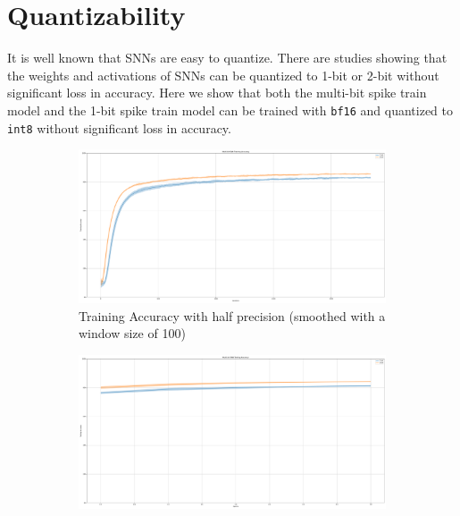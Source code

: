     \section{Quantizability}
    \label{sec:quantizability}
        It is well known that SNNs are easy to quantize. There are studies showing that the weights and activations of SNNs can be quantized to 1-bit or 2-bit without significant loss in accuracy. Here we show that both the multi-bit spike train model and the 1-bit spike train model can be trained with \verb|bf16| and quantized to \verb|int8| without significant loss in accuracy.
        \begin{figure}[!htpb]
            \centering
            \begin{subfigure}[H]{0.48\textwidth}
                \centering
                \includegraphics[width=\textwidth]{../quantized/FashionMNIST/plots/fashionmnist_train_acc.pdf}
                \caption{Training Accuracy with half precision (smoothed with a window size of 100)}
            \end{subfigure}
            \hfill
            \begin{subfigure}[H]{0.48\textwidth}
                \centering
                \includegraphics[width=\textwidth]{../bf16/FashionMNIST/plots/fashionmnist_test_acc.pdf}

\end{subfigure}
\end{figure}
